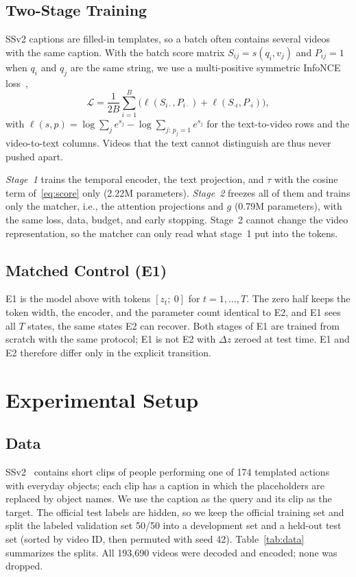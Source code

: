 \documentclass[lettersize,journal]{IEEEtran}
\begin{document}
\subsection{Two-Stage Training}
\label{sec:training}
SSv2 captions are filled-in templates, so a batch often contains several videos
with the same caption. With the batch score matrix $S_{ij}=s(q_i,v_j)$ and
$P_{ij}=1$ when $q_i$ and $q_j$ are the same string, we use a multi-positive
symmetric InfoNCE loss~\cite{oord2018cpc},
\begin{equation}
\label{eq:loss}
\mathcal{L} = \frac{1}{2B}\sum_{i=1}^{B}\Big(\ell(S_{i\cdot},P_{i\cdot}) + \ell(S_{\cdot i},P_{\cdot i})\Big),
\end{equation}
with $\ell(s,p) = \log\sum_{j} e^{s_j} - \log\sum_{j:\,p_j=1} e^{s_j}$ for the
text-to-video rows and the video-to-text columns. Videos that the text cannot
distinguish are thus never pushed apart.

\emph{Stage~1} trains the temporal encoder, the text projection, and $\tau$ with
the cosine term of~\eqref{eq:score} only (2.22M parameters). \emph{Stage~2}
freezes all of them and trains only the matcher, i.e., the attention
projections and $g$ (0.79M parameters), with the same loss, data, budget, and
early stopping. Stage~2 cannot change the video representation, so the matcher
can only read what stage~1 put into the tokens.

\subsection{Matched Control (E1)}
\label{sec:e1}
E1 is the model above with tokens $[z_t;\ 0]$ for $t=1,\dots,T$. The zero half
keeps the token width, the encoder, and the parameter count identical to E2,
and E1 sees all $T$ states, the same states E2 can recover. Both stages of E1
are trained from scratch with the same protocol; E1 is not E2 with $\Delta z$
zeroed at test time. E1 and E2 therefore differ only in the explicit
transition.

\section{Experimental Setup}
\label{sec:setup}
\subsection{Data}
SSv2~\cite{goyal2017ssv2} contains short clips of people performing one of 174
templated actions with everyday objects; each clip has a caption in which the
placeholders are replaced by object names. We use the caption as the query and
its clip as the target. The official test labels are hidden, so we keep the
official training set and split the labeled validation set 50/50 into a
development set and a held-out test set (sorted by video ID, then permuted with
seed 42). Table~\ref{tab:data} summarizes the splits. All 193{,}690 videos were
decoded and encoded; none was dropped.
\end{document}
